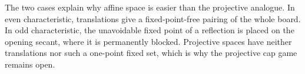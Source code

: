 The two cases explain why affine space is easier than the projective analogue. In even
characteristic, translations give a fixed-point-free pairing of the whole board. In odd
characteristic, the unavoidable fixed point of a reflection is placed on the opening secant,
where it is permanently blocked. Projective spaces have neither translations nor such a
one-point fixed set, which is why the projective cap game remains open.

